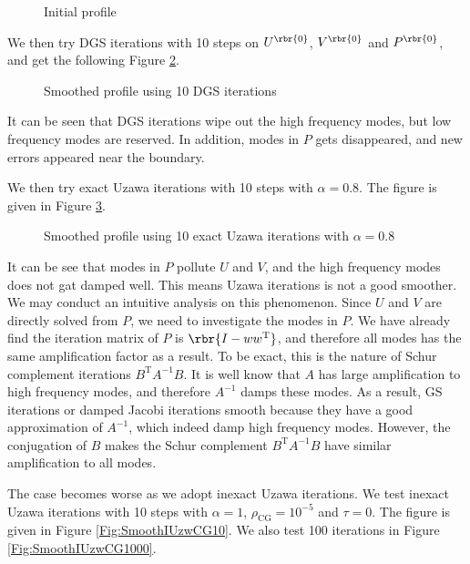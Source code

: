 \documentclass[english, nochinese]{pnote}
\begin{document}
\begin{figure}[htbp]
\centering
\scalebox{0.75}{}
\caption{Initial profile}
\label{Fig:Init}
\end{figure}

We then try DGS iterations with 10 steps on $U^{\rbr{0}}$, $V^{\rbr{0}}$ and $P^{\rbr{0}}$, and get the following Figure \ref{Fig:SmoothDGS}.

\begin{figure}[htbp]
\centering
\scalebox{0.75}{}
\caption{Smoothed profile using 10 DGS iterations}
\label{Fig:SmoothDGS}
\end{figure}

It can be seen that DGS iterations wipe out the high frequency modes, but low frequency modes are reserved. In addition, modes in $P$ gets disappeared, and new errors appeared near the boundary.

We then try exact Uzawa iterations with 10 steps with $ \alpha = 0.8 $. The figure is given in Figure \ref{Fig:SmoothUzw}.

\begin{figure}[htbp]
\centering
\scalebox{0.75}{}
\caption{Smoothed profile using 10 exact Uzawa iterations with $ \alpha = 0.8 $}
\label{Fig:SmoothUzw}
\end{figure}

It can be see that modes in $P$ pollute $U$ and $V$, and the high frequency modes does not gat damped well. This means Uzawa iterations is not a good smoother. We may conduct an intuitive analysis on this phenomenon. Since $U$ and $V$ are directly solved from $P$, we need to investigate the modes in $P$. We have already find the iteration matrix of $P$ is $ \rbr{ I - w w^{\text{T}} } $, and therefore all modes has the same amplification factor as a result. To be exact, this is the nature of Schur complement iterations $ B^{\text{T}} A^{-1} B $. It is well know that $A$ has large amplification to high frequency modes, and therefore $A^{-1}$ damps these modes. As a result, GS iterations or damped Jacobi iterations smooth because they have a good approximation of $A^{-1}$, which indeed damp high frequency modes. However, the conjugation of $B$ makes the Schur complement $ B^{\text{T}} A^{-1} B $ have similar amplification to all modes.

The case becomes worse as we adopt inexact Uzawa iterations. We test inexact Uzawa iterations with 10 steps with $ \alpha = 1 $, $ \rho_{\text{CG}} = 10^{-5} $ and $ \tau = 0 $. The figure is given in Figure \ref{Fig:SmoothIUzwCG10}. We also test 100 iterations in Figure \ref{Fig:SmoothIUzwCG1000}.
\end{document}
